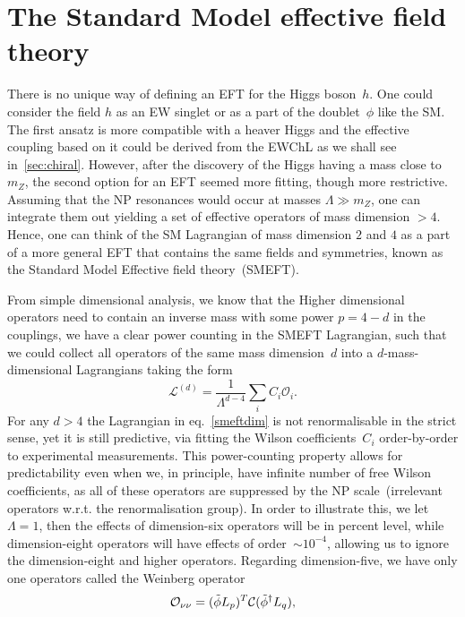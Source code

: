 \section{ The Standard Model effective field theory \label{sec:smeft}}
\par There is no unique way of defining an EFT for the Higgs boson~$h$. One could consider the field $h$ as an EW singlet or as a part of the doublet~$\phi$ like the SM. The first ansatz is more compatible with a heaver Higgs and the effective coupling based on it could be derived from the EWChL as we shall see in~\autoref{sec:chiral}. However, after the discovery of the Higgs having a mass close to $m_Z$, the second option for an EFT seemed more fitting, though more restrictive. Assuming that the NP resonances would occur at masses $\Lambda \gg m_Z$, one can integrate them out yielding a set of effective operators of mass dimension $> 4$.  Hence, one can think of the SM Lagrangian of mass dimension $2$ and $4$ as a part of a more general EFT that contains the same fields and symmetries, known as the Standard Model Effective field theory~(SMEFT). 
\par From simple dimensional analysis, we know that the Higher dimensional operators need to contain an inverse mass with some power $p=4-d$ in the couplings, we have a clear power counting in the SMEFT Lagrangian, such that we could collect all operators of the same mass dimension~$d$ into a $d$-mass-dimensional Lagrangians taking the form
 \begin{equation}
 	\mathcal{L}^{(d)} = \frac{1}{\Lambda^{d-4}} \sum_i  C_i \mathcal{O}_i .
 	\label{smeftdim}
 \end{equation}
For any $d >4$ the Lagrangian in eq.~\eqref{smeftdim}  is not renormalisable in the strict sense, yet it is still predictive, via fitting the Wilson coefficients~$C_i$ order-by-order to experimental measurements. This power-counting property allows for predictability even when we, in principle, have infinite number of free Wilson coefficients, as all of these operators are suppressed by the NP scale~(irrelevant operators w.r.t. the renormalisation group). In order to illustrate this,  we let $\Lambda =1$, then the effects of dimension-six operators will be in percent level, while dimension-eight operators will have effects of order~$\sim10^{-4}$, allowing us to ignore the dimension-eight and higher operators.  Regarding dimension-five, we have only one operators called the Weinberg operator~\cite{PhysRevLett.43.1566}
 \begin{equation}
	\mathcal{O}_{\nu \nu} =(\tilde{\phi} L_p)^T {\cal C} (\tilde{\phi}^{\dagger} L_q),
	\label{weinbergoperator}
\end{equation}
